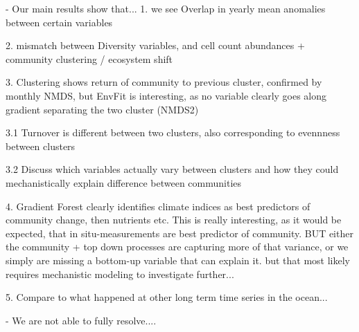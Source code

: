 \documentclass[draft]{agujournal2019}
\begin{document}
- Our main results show that...
1. we see Overlap in yearly mean anomalies between certain variables

2. mismatch between Diversity variables, and cell count abundances + community clustering / ecosystem shift

3. Clustering shows return of community to previous cluster, confirmed by monthly NMDS, but EnvFit is interesting, as no variable clearly goes along gradient separating the two cluster (NMDS2)

3.1 Turnover is different between two clusters, also corresponding to evennness between clusters

3.2 Discuss which variables actually vary between clusters and how they could mechanistically explain difference between communities

4. Gradient Forest clearly identifies climate indices as best predictors of community change, then nutrients etc.
This is really interesting, as it would be expected, that in situ-measurements are best predictor of community. BUT either the community + top down processes are capturing more of that variance, or we simply are missing a bottom-up variable that can explain it.
but that most likely requires mechanistic modeling to investigate further...


5. Compare to what happened at other long term time series in the ocean...






- We are not able to fully resolve....
\end{document}
